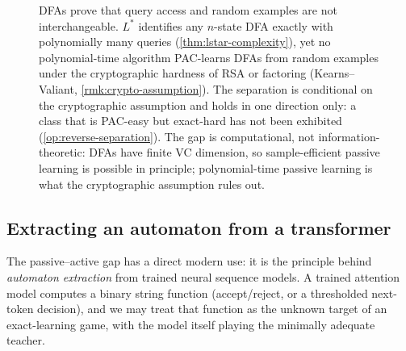 \begin{figure}[ht]
\caption[The passive--active gap on DFAs]{DFAs prove that query access and random examples are not interchangeable. $L^*$ identifies any $n$-state DFA exactly with polynomially many queries (\cref{thm:lstar-complexity}), yet no polynomial-time algorithm PAC-learns DFAs from random examples under the cryptographic hardness of RSA or factoring (Kearns--Valiant, \cref{rmk:crypto-assumption}). The separation is conditional on the cryptographic assumption and holds in one direction only: a class that is PAC-easy but exact-hard has not been exhibited (\cref{op:reverse-separation}). The gap is computational, not information-theoretic: DFAs have finite VC dimension, so sample-efficient passive learning is possible in principle; polynomial-time passive learning is what the cryptographic assumption rules out.}
\label{fig:passive-active-gap}
\end{figure}


\subsection{Extracting an automaton from a transformer}
\label{sec:dfa-extraction}

The passive--active gap has a direct modern use: it is the principle behind \emph{automaton extraction} from trained neural sequence models.  A trained attention model computes a binary string function (accept/reject, or a thresholded next-token decision), and we may treat that function as the unknown target of an exact-learning game, with the model itself playing the minimally adequate teacher.

